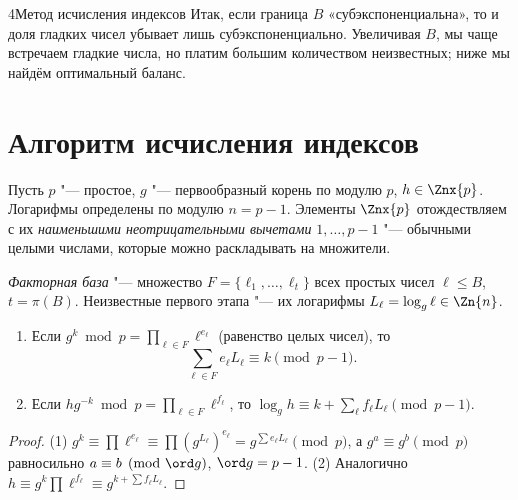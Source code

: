 \begin{lecture}{4}{Метод исчисления индексов}
Итак, если граница $B$ «субэкспоненциальна», то и доля гладких чисел убывает лишь
субэкспоненциально. Увеличивая $B$, мы чаще встречаем гладкие числа, но платим большим
количеством неизвестных; ниже мы найдём оптимальный баланс.


\section{Алгоритм исчисления индексов}

Пусть $p$ "--- простое, $g$ "--- первообразный корень по модулю $p$, $h \in \Znx{p}$. Логарифмы
определены по модулю $n = p - 1$. Элементы $\Znx{p}$ отождествляем с их \emph{наименьшими
неотрицательными вычетами} $1, \dots, p - 1$ "--- обычными целыми числами, которые можно
раскладывать на множители.

\begin{definition}
\emph{Факторная база} "--- множество $F = \{\ell_1, \dots, \ell_t\}$ всех простых чисел
$\ell \le B$, $t = \pi(B)$. Неизвестные первого этапа "--- их логарифмы
$L_\ell = \log_g \ell \in \Zn{n}$.
\end{definition}

\begin{lemma}\label{l4:relation}
\begin{enumerate}
  \item Если $g^k \bmod p = \prod_{\ell \in F} \ell^{e_\ell}$ (равенство целых чисел), то
    \[
      \sum_{\ell \in F} e_\ell L_\ell \equiv k \pmod{p - 1}.
    \]
  \item Если $h g^{-k} \bmod p = \prod_{\ell \in F} \ell^{f_\ell}$, то
    $\log_g h \equiv k + \sum_{\ell} f_\ell L_\ell \pmod{p - 1}$.
\end{enumerate}
\end{lemma}

\begin{proof}
(1) $g^{k} \equiv \prod \ell^{e_\ell} \equiv \prod (g^{L_\ell})^{e_\ell} = g^{\sum e_\ell L_\ell}
\pmod p$, а $g^a \equiv g^b \pmod p$ равносильно $a \equiv b \pmod{\ord g}$, $\ord g = p - 1$.
(2) Аналогично $h \equiv g^{k} \prod \ell^{f_\ell} \equiv g^{k + \sum f_\ell L_\ell}$.
\end{proof}


\end{lecture}
